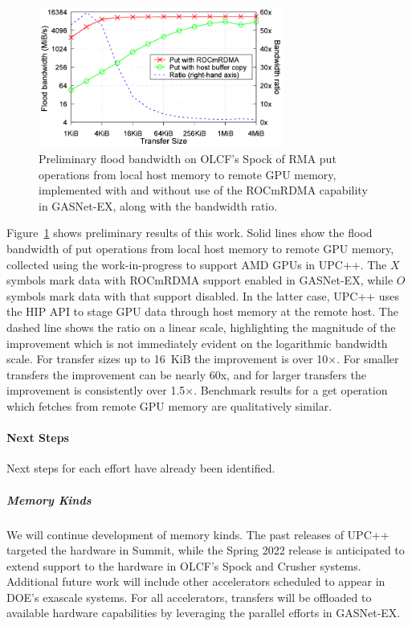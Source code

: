 \begin{figure}[htb]
  \centering
  \captionsetup{width=0.85\linewidth}
  \includegraphics[width=0.72\textwidth]{projects/2.3.1-PMR/2.3.1.14-UPCxx-GASNet/upcxx-spock.pdf}
  \caption{Preliminary flood bandwidth on OLCF's Spock of RMA put operations from
           local host memory to remote GPU memory, implemented with and without
           use of the ROCmRDMA capability in GASNet-EX, along with the bandwidth ratio.}
  \label{fig:upcxx-spock}
\end{figure}

Figure~\ref{fig:upcxx-spock} shows preliminary results of this work.  Solid
lines show the flood bandwidth of put operations from local host memory to
remote GPU memory, collected using the work-in-progress to support AMD GPUs in
UPC++.  The $X$ symbols mark data with ROCmRDMA support enabled in GASNet-EX,
while $O$ symbols mark data with that support disabled.  In the latter case,
UPC++ uses the HIP API to stage GPU data through host memory at the remote
host.  The dashed line shows the ratio on
a linear scale, highlighting the magnitude of the improvement which is not
immediately evident on the logarithmic bandwidth scale.  For transfer
sizes up to 16~KiB the improvement is over 10$\times$.  For smaller transfers the
improvement can be nearly 60x, and for larger transfers the improvement is consistently over
1.5$\times$.  Benchmark results for a get operation which fetches from remote GPU
memory are qualitatively similar.

\paragraph{Next Steps}

Next steps for each effort have already been identified.

\subparagraph{Memory Kinds}
We will continue development of memory kinds.  The
past releases of UPC++ targeted the hardware in Summit, while the Spring 2022
release is anticipated to extend support to the hardware in OLCF's Spock
and Crusher systems.  Additional future work will
include other accelerators scheduled to appear in DOE's exascale systems.
For all accelerators, transfers will be offloaded to available hardware capabilities
by leveraging the parallel efforts in GASNet-EX.

